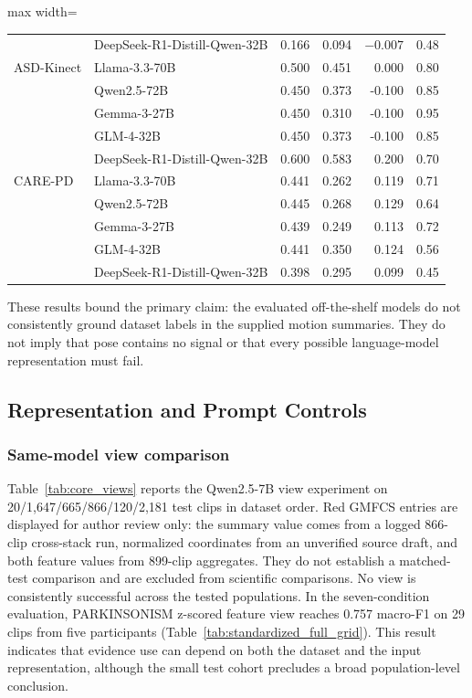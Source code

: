 \begin{table}[H]
\begin{adjustbox}{max width=\textwidth}
\begin{tabular}{llrrrr}
& DeepSeek-R1-Distill-Qwen-32B & 0.166 & 0.094 & $-0.007$ & 0.48 \\
ASD-Kinect & Llama-3.3-70B & 0.500 & 0.451 & 0.000 & 0.80 \\
 & Qwen2.5-72B & 0.450 & 0.373 & -0.100 & 0.85 \\
 & Gemma-3-27B & 0.450 & 0.310 & -0.100 & 0.95 \\
 & GLM-4-32B & 0.450 & 0.373 & -0.100 & 0.85 \\
 & DeepSeek-R1-Distill-Qwen-32B & 0.600 & 0.583 & 0.200 & 0.70 \\
CARE-PD & Llama-3.3-70B & 0.441 & 0.262 & 0.119 & 0.71 \\
 & Qwen2.5-72B & 0.445 & 0.268 & 0.129 & 0.64 \\
 & Gemma-3-27B & 0.439 & 0.249 & 0.113 & 0.72 \\
 & GLM-4-32B & 0.441 & 0.350 & 0.124 & 0.56 \\
 & DeepSeek-R1-Distill-Qwen-32B & 0.398 & 0.295 & 0.099 & 0.45 \\
\bottomrule
\end{tabular}
\end{adjustbox}
\end{table}

These results bound the primary claim: the evaluated off-the-shelf models do not consistently ground dataset labels in the supplied motion summaries. They do not imply that pose contains no signal or that every possible language-model representation must fail.

\subsection{Representation and Prompt Controls}
\label{sec:supp_controls}

\subsubsection{Same-model view comparison}

Table~\ref{tab:core_views} reports the Qwen2.5-7B view experiment on 20/1,647/665/866/120/2,181 test clips in dataset order. Red GMFCS entries are displayed for author review only: the summary value comes from a logged 866-clip cross-stack run, normalized coordinates from an unverified source draft, and both feature values from 899-clip aggregates. They do not establish a matched-test comparison and are excluded from scientific comparisons. No view is consistently successful across the tested populations. In the seven-condition evaluation, PARKINSONISM
z-scored feature view reaches 0.757 macro-F1 on 29 clips from five
participants (Table~\ref{tab:standardized_full_grid}). This result
indicates that evidence use can depend on both the dataset and the input
representation, although the small test cohort precludes a broad
population-level conclusion.

